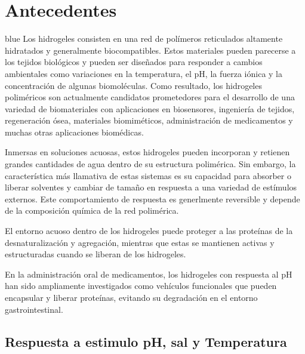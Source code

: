 
\chapter{Antecedentes} %

\label{Chapter-film} %

\begin{color}{blue}
Los hidrogeles consisten en una red de pol\'imeros reticulados altamente hidratados y generalmente biocompatibles. Estos materiales pueden parecerse a los tejidos biol\'ogicos y pueden ser dise\~nados para responder a cambios ambientales como variaciones en la temperatura, el pH, la fuerza i\'onica y la concentraci\'on de algunas biomol\'eculas. Como resultado, los hidrogeles polim\'ericos son actualmente candidatos prometedores para el desarrollo de una variedad de biomateriales con aplicaciones en biosensores, ingenier\'ia de tejidos, regeneraci\'on \'osea, materiales biomim\'eticos, administraci\'on de medicamentos y muchas otras aplicaciones biom\'edicas. \cite{Daly2020}


	Inmersas en soluciones acuosas, estos hidrogeles pueden incorporan y retienen grandes cantidades de agua dentro de su estructura polim\'erica.
	Sin embargo, la caracter\'istica m\'as llamativa de estas sistemas es su capacidad para absorber o liberar solventes y cambiar de tama\~no en respuesta a una variedad de est\'imulos externos.
	Este comportamiento de respuesta es  generlmente reversible y depende de la composici\'on qu\'imica de la red polim\'erica.

 El entorno acuoso dentro de los hidrogeles puede proteger a las prote\'inas de la desnaturalizaci\'on y agregaci\'on, mientras que estas se mantienen activas y estructuradas cuando se liberan de los hidrogeles. \addcite
 
 En la administraci\'on oral de medicamentos, los hidrogeles con respuesta al pH han sido ampliamente investigados como veh\'iculos funcionales que pueden encapsular y liberar prote\'inas, evitando su degradaci\'on en el entorno gastrointestinal. \addcite
\end{color}


\section{Respuesta a estimulo pH, sal y Temperatura}

